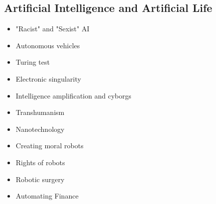 \documentclass[12pt,a4paper]{report}
\begin{document}
\subsection*{Artificial Intelligence and Artificial Life}
\begin{itemize}
\item "Racist" and "Sexist" AI
\item Autonomous vehicles
\item Turing test
\item Electronic singularity
\item Intelligence amplification and cyborgs
\item Transhumanism
\item Nanotechnology
\item Creating moral robots
\item Rights of robots
\item Robotic surgery
\item Automating Finance
\end{itemize}
\end{document}

